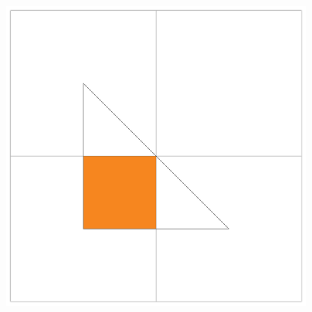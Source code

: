 \begin{figure}[!htb]
  \includegraphics[width=\linewidth]{drawings/examples/cube_example/cubes_01.pdf}
  

\end{figure}
